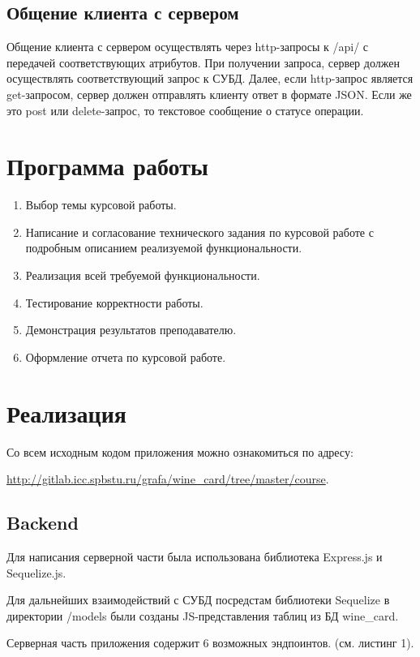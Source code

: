 \subsection{Общение клиента с сервером}
Общение клиента с сервером осуществлять через http-запросы к /api/ с передачей соответствующих атрибутов.
При получении запроса, сервер должен осуществлять соответствующий запрос к СУБД. Далее, если http-запрос является get-запросом, сервер должен отправлять клиенту ответ в формате JSON. Если же это post или delete-запрос, то текстовое сообщение о статусе операции.

\newpage
\section{Программа работы}
\begin{enumerate}
	\item Выбор темы курсовой работы.
	\item Написание и согласование технического задания по курсовой работе с подробным описанием реализуемой функциональности.
	\item Реализация всей требуемой функциональности.
	\item Тестирование корректности работы.
	\item Демонстрация результатов преподавателю.
	\item Оформление отчета по курсовой работе.
\end{enumerate}

\section{Реализация}
Со всем исходным кодом приложения можно ознакомиться по адресу:

\href{http://gitlab.icc.spbstu.ru/grafa/wine_card/tree/master/course}{http://gitlab.icc.spbstu.ru/grafa/wine\_card/tree/master/course}.
\subsection{Backend}
Для написания серверной части была использована библиотека Express.js и Sequelize.js.

Для дальнейших взаимодействий с СУБД посредстам библиотеки Sequelize в директории /models были созданы JS-представления таблиц из БД wine\_card.

Серверная часть приложения содержит 6 возможных эндпоинтов. (см. листинг 1).

